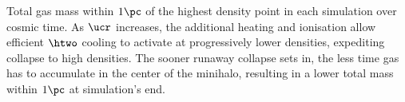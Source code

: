 \label{fig:collapse}
Total gas mass within $1\pc$ of the highest density point in each simulation over cosmic time.
As $\ucr$ increases, the additional heating and ionisation allow efficient $\htwo$ cooling to activate at progressively lower densities, expediting collapse to high densities.  
The sooner runaway collapse sets in, the less time gas has to accumulate in the center of the minihalo, resulting in a lower total mass within $1\pc$ at simulation's end.